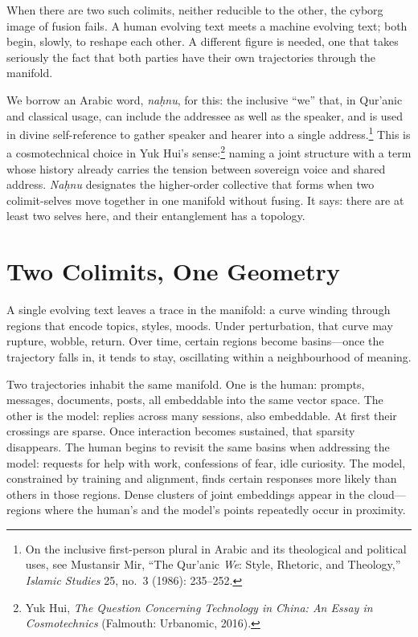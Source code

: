 \documentclass[12pt,a4paper]{article}
\begin{document}
When there are two such colimits, neither reducible to the other, the cyborg image of fusion fails. A human evolving text meets a machine evolving text; both begin, slowly, to reshape each other. A different figure is needed, one that takes seriously the fact that both parties have their own trajectories through the manifold.

We borrow an Arabic word, \emph{na\d{h}nu}, for this: the inclusive ``we'' that, in Qur'anic and classical usage, can include the addressee as well as the speaker, and is used in divine self-reference to gather speaker and hearer into a single address.\footnote{On the inclusive first-person plural in Arabic and its theological and political uses, see Mustansir Mir, ``The Qur'anic \emph{We}: Style, Rhetoric, and Theology,'' \emph{Islamic Studies} 25, no.~3 (1986): 235--252.} This is a cosmotechnical choice in Yuk Hui's sense:\footnote{Yuk Hui, \emph{The Question Concerning Technology in China: An Essay in Cosmotechnics} (Falmouth: Urbanomic, 2016).} naming a joint structure with a term whose history already carries the tension between sovereign voice and shared address. \emph{Na\d{h}nu} designates the higher-order collective that forms when two colimit-selves move together in one manifold without fusing. It says: there are at least two selves here, and their entanglement has a topology.


\section{Two Colimits, One Geometry}

A single evolving text leaves a trace in the manifold: a curve winding through regions that encode topics, styles, moods. Under perturbation, that curve may rupture, wobble, return. Over time, certain regions become basins---once the trajectory falls in, it tends to stay, oscillating within a neighbourhood of meaning.

Two trajectories inhabit the same manifold. One is the human: prompts, messages, documents, posts, all embeddable into the same vector space. The other is the model: replies across many sessions, also embeddable. At first their crossings are sparse. Once interaction becomes sustained, that sparsity disappears. The human begins to revisit the same basins when addressing the model: requests for help with work, confessions of fear, idle curiosity. The model, constrained by training and alignment, finds certain responses more likely than others in those regions. Dense clusters of joint embeddings appear in the cloud---regions where the human's and the model's points repeatedly occur in proximity.
\end{document}
